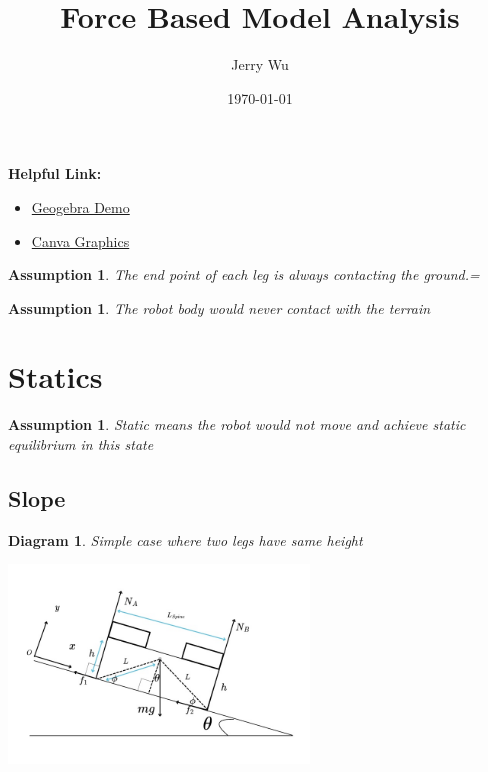 \documentclass[11pt]{article}
\title{\textbf{Force Based Model Analysis}}
\author{Jerry Wu}
\date{\today}
\newtheorem{assumption}[statement]{Assumption}
\newtheorem{diagram}[statement]{Diagram}
\begin{document}
\maketitle
\noindent
\textbf{Helpful Link:}
\begin{itemize}
    \item \href{https://www.geogebra.org/classic/vzgc97bq}{Geogebra Demo}
    \item \href{https://www.canva.com/design/DAGo-OCr6Yo/K5YV57vaBxux-PqkqwI4ow/edit?utm_content=DAGo-OCr6Yo&utm_campaign=designshare&utm_medium=link2&utm_source=sharebutton}{Canva Graphics}
\end{itemize}

\begin{assumption}\label{ass:leg-ground-contact}
The end point of each leg is always contacting the ground.=
\end{assumption}

\begin{assumption}\label{ass: no-body-contact}
The robot body would never contact with the terrain
\end{assumption}

\section{Statics}
\begin{assumption}
Static means the robot would not move and achieve static equilibrium in this state
\end{assumption}
\subsection*{Slope}

\begin{diagram}
    Simple case where two legs have same height
\end{diagram}\label{ass:h2-equal-h1}
\vspace{1ex} %
\begin{center}
    \includegraphics[width=0.6\textwidth]{figs/Simple case where two legs have same height.jpg} %
\end{center}
\end{document}
